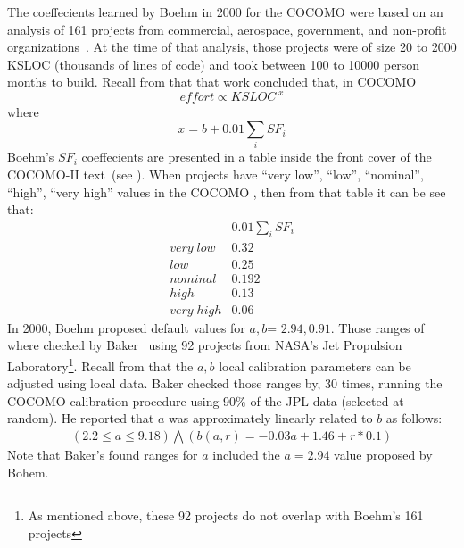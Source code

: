 The coeffecients learned by Boehm in 2000 for the
COCOMO were based on an analysis of 
161 projects from commercial, aerospace, government, and non-profit organizations~\cite{boehm00b}. At the time of that analysis,
those  projects   were of size 20 to 2000 KSLOC (thousands of lines of code) and took between 100 to 10000 person months to build.
Recall from  that that work concluded that, in COCOMO
\begin{equation}\label{eq:zero}
\mathit{effort} \propto \mathit{KSLOC}^{\;x}
\end{equation}
where 
\begin{equation}\label{eq:sum1}
x={b + 0.01 \sum_i SF_i}
\end{equation}
Boehm's   $SF_i$ coeffecients
are presented in a table inside the front cover of the COCOMO-II text~\cite{boehm00a}(see ).
When
  projects have ``very low'', ``low'', ``nominal'', ``high'', ``very high'' values in the COCOMO , then from that table it can be see that:
\begin{equation}\label{eq:sf1}
\begin{array}{r|l}
  &0.01 \sum_i  SF_i \\\hline
\mathit{very\; low} & 0.32\\
\mathit{  low} &   0.25\\
\mathit{nominal} &  0.192\\
\mathit{high} &  0.13\\
\mathit{very\; high} &  0.06  
\end{array}
\end{equation}
In 2000, Boehm proposed default values for $a,b$= $2.94,0.91$.
Those ranges of   where checked    by Baker~\cite{baker07} 
using 92 projects from NASA's Jet Propulsion Laboratory\footnote{As mentioned
above, these 92 projects do not overlap with Boehm's 161 projects}.  Recall from 
that the $a,b$ local calibration parameters can be adjusted using local data. 
Baker checked those ranges by,  30 times, running the COCOMO
calibration procedure using 90\% of the JPL data (selected
at random). He reported that
 $a$ was approximately linearly related to $b$ as follows:
\[
\begin{array}{c}
\left(2.2 \le a \le 9.18\right) \bigwedge  \left(b(a,r) = -0.03a + 1.46 + r*0.1\right)
\end{array}
\]
Note that Baker's found ranges for $a$ included the $a=2.94$ value proposed by Bohem.


